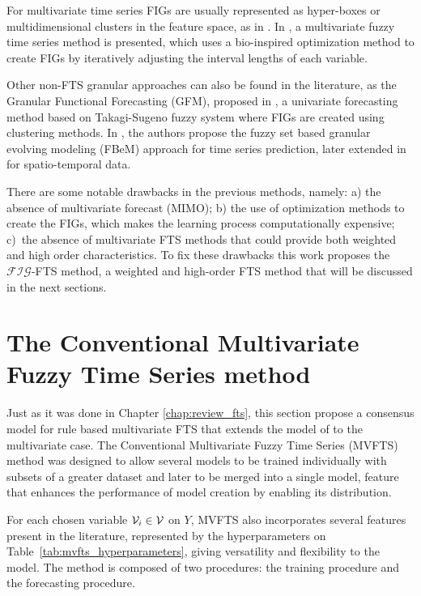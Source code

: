For multivariate time series FIGs are usually represented as hyper-boxes or multidimensional clusters in the feature space, as in \cite{Reyes-Galaviz2016, Singh2018}.  In \cite{Singh2018},  a multivariate fuzzy time series method is presented, which uses a bio-inspired optimization method to create FIGs by iteratively adjusting the interval lengths of each variable.

Other non-FTS granular approaches can also be found in the literature, as the Granular Functional Forecasting (GFM), proposed in \cite{Magalhaes2008}, a univariate forecasting method based on Takagi-Sugeno fuzzy system where FIGs are created using clustering methods. In \cite{Leite2011}, the authors propose the fuzzy set  based  granular  evolving modeling (FBeM) approach for time series prediction, later extended in \cite{Soares2018} for spatio-temporal data.

There are some notable drawbacks in the previous methods, namely: a) the absence of multivariate forecast (MIMO); b) the use of optimization methods to create the FIGs, which makes the learning process computationally expensive; c)~the absence of multivariate FTS methods that could provide both weighted and high order characteristics. To fix these drawbacks this work proposes the $\mathcal{FIG}$-FTS method, a weighted and high-order FTS method that will be discussed in the next sections. 

\section{The Conventional Multivariate Fuzzy Time Series method}
\label{sec:mvfts}

Just as it was done in Chapter \ref{chap:review_fts}, this section propose a consensus model for rule based multivariate FTS that extends the model of \cite{chen1996forecasting} to the multivariate case. The Conventional Multivariate Fuzzy Time Series (MVFTS) method was designed to allow several models to be trained individually with subsets of a greater dataset and later to be merged into a single model, feature that enhances the performance of model creation by enabling its distribution.

For each chosen variable $\mathcal{V}_i \in \mathcal{V}$ on $Y$, MVFTS also incorporates several features present in the literature, represented by the hyperparameters on Table~\ref{tab:mvfts_hyperparameters}, giving versatility and flexibility to the model. The method is composed of two procedures: the training procedure and the forecasting procedure.

